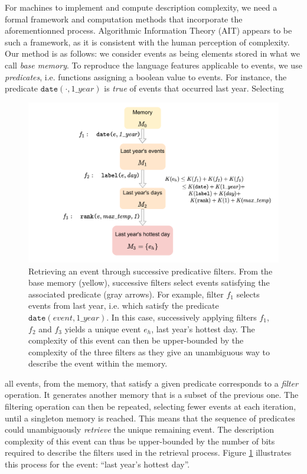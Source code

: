 \documentclass[entropy,article,submit,moreauthors,pdftex]{Definitions/mdpi}
\begin{document}
For machines to implement and compute description complexity, we need a formal framework and computation methods that incorporate the aforementionned process. Algorithmic Information Theory (AIT) appears to be such a framework, as it is consistent with the human perception of complexity\cite{li_introduction_2008,dessalles2011coincidences,delahaye_numerical_2012}. Our method is as follows: we
consider events as being elements stored in what we call \emph{base memory}. To
reproduce the language features applicable to events, we use \emph
{predicates}, i.e. functions assigning a boolean value to events. For instance, the predicate $\mathtt{date}
(\cdot, 1\_year)$ is \emph{true} of events that occurred last year. Selecting
\begin{figure}[hb]
    \centering
    \includegraphics[width=.95\linewidth]{figures/filters}
    \caption{Retrieving an event through successive predicative
        filters. From the base memory (yellow), successive filters select events satisfying the associated predicate (gray arrows). For example,
        filter $f_1$ selects events from last year, i.e. which satisfy the
        predicate $\mathtt{date}(event, 1\_year)$. In this case, successively
        applying filters $f_1$, $f_2$ and $f_3$ yields a unique event $e_h$, last
        year's hottest day. The complexity of this event can then be upper-bounded
        by the complexity of the three filters as they give an unambiguous way
        to describe the event within the memory.}
    \label{fig:filters}
\end{figure}
all events, from the memory, that satisfy a given predicate corresponds to
a \emph{filter} operation. It generates another memory that is a subset of the previous one.
The filtering operation can then be repeated, selecting
fewer events at each iteration, until a singleton memory is reached. This means that the sequence
of predicates could unambiguously \emph{retrieve} the unique remaining event.
The description complexity of this event can thus be upper-bounded by the
number of bits required to describe the filters used in the retrieval
process. Figure \ref{fig:filters} illustrates this process for the event: ``last year's hottest day''.
\end{document}
